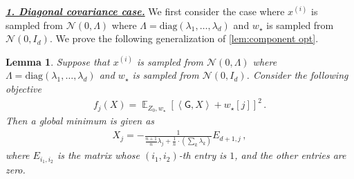 \documentclass{article}
\DeclareMathOperator{\E}{\mathbb{E}}
\newtheorem{lemma}{Lemma}
\newcommand{\wstar}{w_\star}
\newcommand{\tx}[1]{x^{(#1)}}
\newcommand{\MM}{\mathsf{G}}
\newcommand{\emphh}[1]{\textbf{\emph{#1}}}
\newcommand{\inp}[2]{\left \langle #1,#2\right\rangle}
\begin{document}
\underline{\emphh{1. Diagonal covariance case.}}
We first  consider the case where  $\tx{i}$ is sampled from $\mathcal{N}(0, \Lambda)$ where $\Lambda = \mathrm{diag}(\lambda_1,\dots, \lambda_d)$ and  $\wstar$ is sampled  from $\mathcal{N}(0, I_d)$.  
We prove the following generalization of \autoref{lem:component opt}.
 
\begin{lemma} \label{lem:component opt_noniso}
Suppose that $\tx{i}$ is sampled from $\mathcal{N}(0, \Lambda)$ where $\Lambda = \mathrm{diag}(\lambda_1,\dots, \lambda_d)$ and  $\wstar$ is sampled  from $\mathcal{N}(0, I_d)$. 
Consider the following objective
\begin{align}
f_j(X) =  \E_{Z_0,\wstar}\left[ \inp{\MM}{X}  + \wstar[j] \right]^2\,.
\end{align} 
Then a global minimum is given as 
\begin{align} \label{exp:opt_single_non}
X_j = - \frac{1}{  \frac{n+1}{n}  \lambda_j +   \frac{1}{n} \cdot \left( \sum_k \lambda_k  \right)   } E_{d+1,j}\,,
\end{align} where $E_{i_1,i_2}$ is the matrix whose $(i_1,i_2)$-th entry is $1$,  and the other entries are zero.
\end{lemma}
\end{document}
